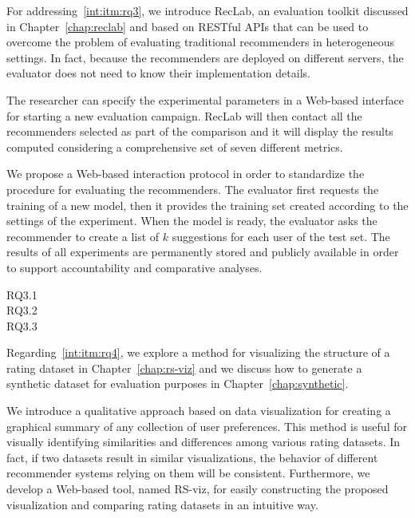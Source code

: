 For addressing~\ref{int:itm:rq3}, we introduce RecLab, an evaluation toolkit discussed in Chapter~\ref{chap:reclab} and based on RESTful APIs that can be used to overcome the problem of evaluating traditional recommenders in heterogeneous settings. In fact, because the recommenders are deployed on different servers, the evaluator does not need to know their implementation details.

The researcher can specify the experimental parameters in a Web-based interface for starting a new evaluation campaign. RecLab will then contact all the recommenders selected as part of the comparison and it will display the results computed considering a comprehensive set of seven different metrics.

We propose a Web-based interaction protocol in order to standardize the procedure for evaluating the recommenders. The evaluator first requests the training of a new model, then it provides the training set created according to the settings of the experiment. When the model is ready, the evaluator asks the recommender to create a list of $k$ suggestions for each user of the test set. The results of all experiments are permanently stored and publicly available in order to support accountability and comparative analyses. 

\begin{description}
\item[RQ3.1] 
\item[RQ3.2] 
\item[RQ3.3] 
\end{description}

Regarding~\ref{int:itm:rq4}, we explore a method for visualizing the structure of a rating dataset in Chapter~\ref{chap:rs-viz} and we discuss how to generate a synthetic dataset for evaluation purposes in Chapter~\ref{chap:synthetic}.

We introduce a qualitative approach based on data visualization for creating a graphical summary of any collection of user preferences. This method is useful for visually identifying similarities and differences among various rating datasets. In fact, if two datasets result in similar visualizations, the behavior of different recommender systems relying on them will be consistent. Furthermore, we develop a Web-based tool, named RS-viz, for easily constructing the proposed visualization and comparing rating datasets in an intuitive way. 

